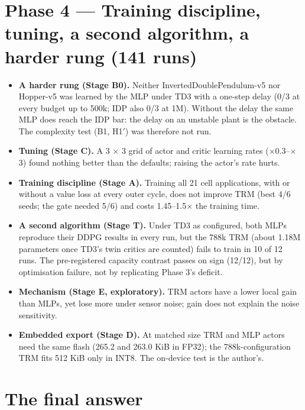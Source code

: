 \documentclass[11pt]{article}
\begin{document}
\section*{Phase 4 --- Training discipline, tuning, a second algorithm, a harder rung (141 runs)}



\begin{itemize}
\item \textbf{A harder rung (Stage B0).} Neither InvertedDoublePendulum-v5 nor Hopper-v5 was learned by the MLP under TD3 with a one-step delay (0/3 at every budget up to 500k; IDP also 0/3 at 1M). Without the delay the same MLP does reach the IDP bar: the delay on an unstable plant is the obstacle. The complexity test (B1, H1$'$) was therefore not run.
\item \textbf{Tuning (Stage C).} A 3 $\times$ 3 grid of actor and critic learning rates ($\times$0.3--$\times$3) found nothing better than the defaults; raising the actor's rate hurts.
\item \textbf{Training discipline (Stage A).} Training all 21 cell applications, with or without a value loss at every outer cycle, does not improve TRM (best 4/6 seeds; the gate needed 5/6) and costs 1.45--1.5$\times$ the training time.
\item \textbf{A second algorithm (Stage T).} Under TD3 as configured, both MLPs reproduce their DDPG results in every run, but the 788k TRM (about 1.18M parameters once TD3's twin critics are counted) fails to train in 10 of 12 runs. The pre-registered capacity contrast passes on sign (12/12), but by optimisation failure, not by replicating Phase 3's deficit.
\item \textbf{Mechanism (Stage E, exploratory).} TRM actors have a lower local gain than MLPs, yet lose more under sensor noise; gain does not explain the noise sensitivity.
\item \textbf{Embedded export (Stage D).} At matched size TRM and MLP actors need the same flash (265.2 and 263.0 KiB in FP32); the 788k-configuration TRM fits 512 KiB only in INT8. The on-device test is the author's.
\end{itemize}



\medskip



\section*{The final answer}
\end{document}
